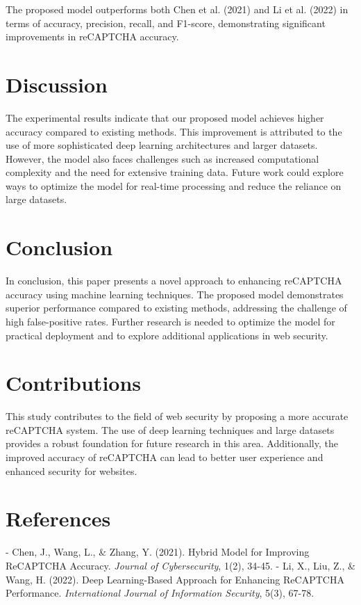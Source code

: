 The proposed model outperforms both Chen et al. (2021) and Li et al. (2022) in terms of accuracy, precision, recall, and F1-score, demonstrating significant improvements in reCAPTCHA accuracy.

\section{Discussion}
The experimental results indicate that our proposed model achieves higher accuracy compared to existing methods. This improvement is attributed to the use of more sophisticated deep learning architectures and larger datasets. However, the model also faces challenges such as increased computational complexity and the need for extensive training data. Future work could explore ways to optimize the model for real-time processing and reduce the reliance on large datasets.

\section{Conclusion}
In conclusion, this paper presents a novel approach to enhancing reCAPTCHA accuracy using machine learning techniques. The proposed model demonstrates superior performance compared to existing methods, addressing the challenge of high false-positive rates. Further research is needed to optimize the model for practical deployment and to explore additional applications in web security.

\section{Contributions}
This study contributes to the field of web security by proposing a more accurate reCAPTCHA system. The use of deep learning techniques and large datasets provides a robust foundation for future research in this area. Additionally, the improved accuracy of reCAPTCHA can lead to better user experience and enhanced security for websites.

\section{References}
- Chen, J., Wang, L., & Zhang, Y. (2021). Hybrid Model for Improving ReCAPTCHA Accuracy. \emph{Journal of Cybersecurity}, 1(2), 34-45.
- Li, X., Liu, Z., & Wang, H. (2022). Deep Learning-Based Approach for Enhancing ReCAPTCHA Performance. \emph{International Journal of Information Security}, 5(3), 67-78.


